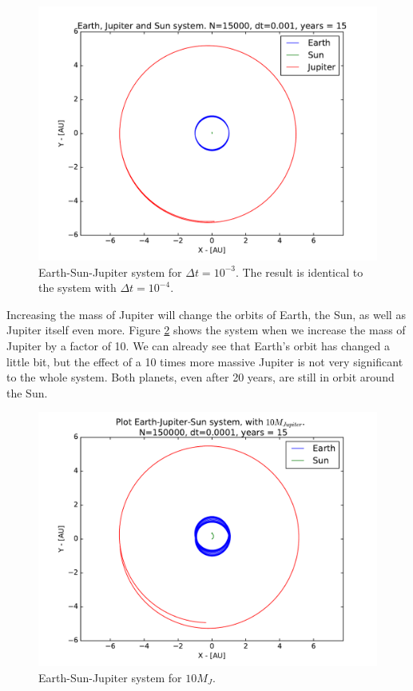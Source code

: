 \documentclass[12pt]{article}
\begin{document}
\begin{figure}[!h]
\centering
\includegraphics[width=\linewidth]{Plots/Earth_Sun_Jupiter_largerdt.pdf}
\caption{Earth-Sun-Jupiter system for $\Delta t = 10^{-3}$. The result is identical to the system with $\Delta t = 10^{-4}$.}
\label{fig:ESJ_stability}
\end{figure}

Increasing the mass of Jupiter will change the orbits of Earth, the Sun, as well as Jupiter itself even more. Figure \ref{ESJ_10MJ} shows the system when we increase the mass of Jupiter by a factor of 10. We can already see that Earth's orbit has changed a little bit, but the effect of a 10 times more massive Jupiter is not very significant to the whole system. Both planets, even after 20 years, are still in orbit around the Sun.
\begin{figure}[!h]
\centering
\includegraphics[width=\linewidth]{Plots/Earth_Sun_Jupiter_10MJ.pdf}
\caption{Earth-Sun-Jupiter system for $10M_J$.}
\label{ESJ_10MJ}
\end{figure}
\end{document}
